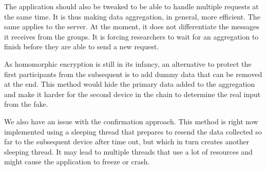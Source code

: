 The application should also be tweaked to be able to handle multiple requests at the same time. It is thus making data aggregation, in general, more efficient. The same applies to the server. At the moment, it does not differentiate the messages it receives from the groups. It is forcing researchers to wait for an aggregation to finish before they are able to send a new request.

As homomorphic encryption is still in its infancy, an alternative to protect the first participants from the subsequent is to add dummy data that can be removed at the end. This method would hide the primary data added to the aggregation and make it harder for the second device in the chain to determine the real input from the fake.

We also have an issue with the confirmation approach. This method is right now implemented using a sleeping thread that prepares to resend the data collected so far to the subsequent device after time out, but which in turn creates another sleeping thread. It may lead to multiple threads that use a lot of resources and might cause the application to freeze or crash.

